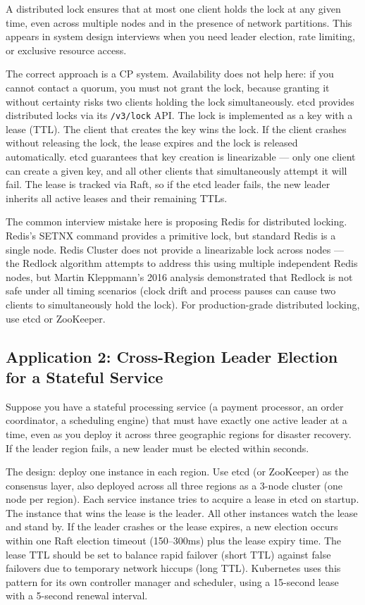 \documentclass[11pt,a4paper]{article}
\begin{document}
A distributed lock ensures that at most one client holds the lock at any given time, even across multiple nodes and in the presence of network partitions. This appears in system design interviews when you need leader election, rate limiting, or exclusive resource access.

The correct approach is a CP system. Availability does not help here: if you cannot contact a quorum, you must not grant the lock, because granting it without certainty risks two clients holding the lock simultaneously. etcd provides distributed locks via its \texttt{/v3/lock} API. The lock is implemented as a key with a lease (TTL). The client that creates the key wins the lock. If the client crashes without releasing the lock, the lease expires and the lock is released automatically. etcd guarantees that key creation is linearizable --- only one client can create a given key, and all other clients that simultaneously attempt it will fail. The lease is tracked via Raft, so if the etcd leader fails, the new leader inherits all active leases and their remaining TTLs.

The common interview mistake here is proposing Redis for distributed locking. Redis's SETNX command provides a primitive lock, but standard Redis is a single node. Redis Cluster does not provide a linearizable lock across nodes --- the Redlock algorithm attempts to address this using multiple independent Redis nodes, but Martin Kleppmann's 2016 analysis demonstrated that Redlock is not safe under all timing scenarios (clock drift and process pauses can cause two clients to simultaneously hold the lock). For production-grade distributed locking, use etcd or ZooKeeper.

\subsection{Application 2: Cross-Region Leader Election for a Stateful Service}

Suppose you have a stateful processing service (a payment processor, an order coordinator, a scheduling engine) that must have exactly one active leader at a time, even as you deploy it across three geographic regions for disaster recovery. If the leader region fails, a new leader must be elected within seconds.

The design: deploy one instance in each region. Use etcd (or ZooKeeper) as the consensus layer, also deployed across all three regions as a 3-node cluster (one node per region). Each service instance tries to acquire a lease in etcd on startup. The instance that wins the lease is the leader. All other instances watch the lease and stand by. If the leader crashes or the lease expires, a new election occurs within one Raft election timeout (150--300ms) plus the lease expiry time. The lease TTL should be set to balance rapid failover (short TTL) against false failovers due to temporary network hiccups (long TTL). Kubernetes uses this pattern for its own controller manager and scheduler, using a 15-second lease with a 5-second renewal interval.
\end{document}
